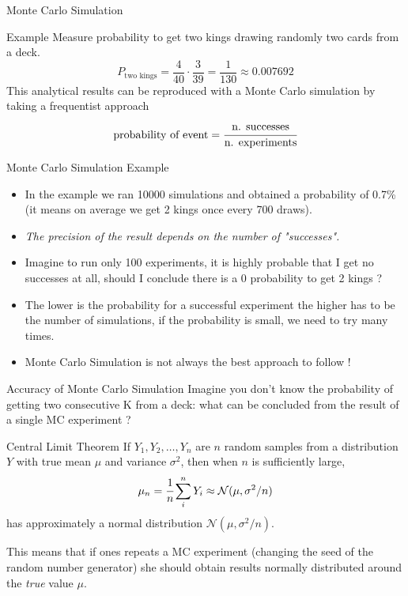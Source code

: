\documentclass{beamer}
\begin{document}
\begin{frame}{Monte Carlo Simulation}
\begin{block}{Example}
Measure probability to get two kings drawing randomly two cards from a deck.
\begin{equation*}
P_{\textrm{two kings}} = \frac{4}{40} \cdot \frac{3}{39} = \frac{1}{130} \approx 0.007692
\end{equation*}
This analytical results can be reproduced with a Monte Carlo simulation by taking a frequentist approach
\begin{equation*}
\textrm{probability of event} = \cfrac{\textrm{n. successes}}{\textrm{n. experiments}}
\end{equation*}
\end{block}
\end{frame}

\begin{frame}{Monte Carlo Simulation Example}
\begin{itemize}
    \item In the example we ran 10000 simulations and obtained a probability of 0.7\% (it means on average we get 2 kings once every 700 draws).
    \item \emph{The precision of the result depends on the number of "successes".}
    \item Imagine to run only 100 experiments, it is highly probable that I get no successes at all, should I conclude there is a 0 probability to get 2 kings ?
    \item The lower is the probability for a successful experiment the higher has to be the number of simulations, if the probability is small, we need to try many times.
    \item Monte Carlo Simulation is not always the best approach to follow !
\end{itemize}
\end{frame}

\begin{frame}{Accuracy of Monte Carlo Simulation}
Imagine you don't know the probability of getting two consecutive K from a deck: what can be concluded from the result of a single MC experiment ?
\begin{block}{Central Limit Theorem}    
If $Y_1, Y_2,\dots, Y_n$ are $n$ random samples from a distribution $Y$ with true mean $\mu$ and variance $\sigma^{2}$, then when $n$ is sufficiently large, 
\begin{equation*}
\mu_n = \cfrac{1}{n}\sum_i^n Y_i \approx \mathcal{N}(\mu, \sigma^2/n)
\end{equation*}
has approximately a normal distribution $\mathcal{N}(\mu, \sigma^2/n)$. 

This means that if ones repeats a MC experiment (changing the seed of the random number generator) she should obtain results normally distributed around the \emph{true} value $\mu$.
\end{block}
\end{frame}
\end{document}
